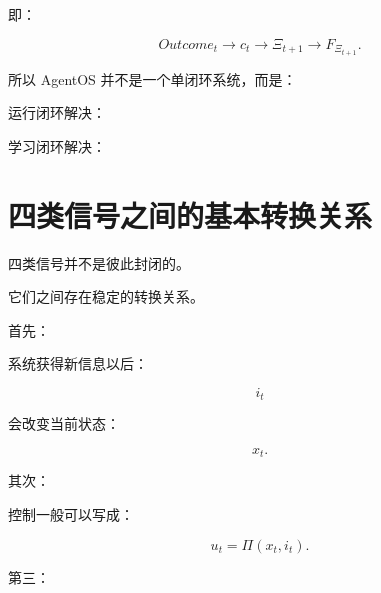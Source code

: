 即：

\[
Outcome_t
\rightarrow
c_t
\rightarrow
\Xi_{t+1}
\rightarrow
F_{\Xi_{t+1}}.
\]

所以 AgentOS 并不是一个单闭环系统，而是：

\begin{statementbox}
\centering
{}
\end{statementbox}

运行闭环解决：

\begin{statementbox}
\centering
{}
\end{statementbox}

学习闭环解决：

\begin{statementbox}
\centering
{}
\end{statementbox}

\section{四类信号之间的基本转换关系}

四类信号并不是彼此封闭的。

它们之间存在稳定的转换关系。

首先：

\begin{statementbox}
\centering
{}
\end{statementbox}

系统获得新信息以后：

\[
i_t
\]

会改变当前状态：

\[
x_t.
\]

其次：

\begin{statementbox}
\centering
{}
\end{statementbox}

控制一般可以写成：

\[
u_t
=
\Pi(
x_t,
i_t
).
\]

第三：

\begin{statementbox}
\centering
{}
\end{statementbox}

